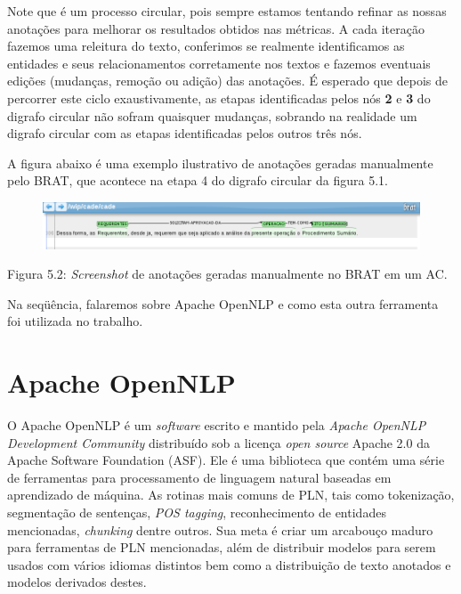 \documentclass[11pt]{report}
\begin{document}
Note que é um processo circular, pois sempre estamos tentando refinar as nossas anotações para melhorar os resultados obtidos nas métricas. A cada iteração
fazemos uma releitura do texto, conferimos se realmente identificamos as entidades e seus relacionamentos corretamente nos textos e fazemos eventuais edições
(mudanças, remoção ou adição) das anotações. É esperado que depois de percorrer este ciclo exaustivamente, as etapas identificadas pelos nós \textbf{2} e \textbf{3}
do digrafo circular não sofram quaisquer mudanças, sobrando na realidade um digrafo circular com as etapas identificadas pelos outros três nós.

A figura abaixo é uma exemplo ilustrativo de anotações geradas manualmente pelo BRAT, que acontece na etapa 4 do digrafo circular da figura 5.1.
\begin{figure}[h!]
  \hspace*{-1.8cm}
  \includegraphics[scale=0.59]{brat}
\end{figure}

\begin{center}
  Figura 5.2: \textit{Screenshot} de anotações geradas manualmente no BRAT em um AC.
\end{center}

Na seqüência, falaremos sobre Apache OpenNLP e como esta outra ferramenta foi utilizada no trabalho.

\section{Apache OpenNLP}

\indent\indent O Apache OpenNLP é um \textit{software} escrito e mantido pela \textit{Apache OpenNLP Development Community} distribuído sob a licença \textit{open source}
Apache 2.0 da Apache Software Foundation (ASF). Ele é uma biblioteca que contém uma série de ferramentas para processamento de linguagem natural baseadas em aprendizado
de máquina. As rotinas mais comuns de PLN, tais como tokenização, segmentação de sentenças, \textit{POS tagging}, reconhecimento de entidades mencionadas, \textit{chunking}
dentre outros. Sua meta é criar um arcabouço maduro para ferramentas de PLN mencionadas, além de distribuir modelos para serem usados com vários idiomas distintos bem como
a distribuição de texto anotados e modelos derivados destes.
\end{document}
